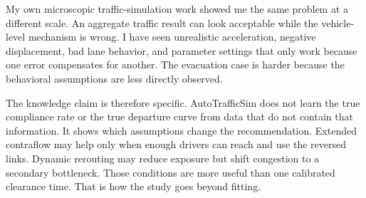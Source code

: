\begin{bibunit}[plainnat]
My own microscopic traffic-simulation work showed me the same problem
at a different scale. An aggregate traffic result can look acceptable
while the vehicle-level mechanism is wrong. I have seen unrealistic
acceleration, negative displacement, bad lane behavior, and parameter
settings that only work because one error compensates for another. The
evacuation case is harder because the behavioral assumptions are less
directly observed.

The knowledge claim is therefore specific. AutoTrafficSim does not
learn the true compliance rate or the true departure curve from data
that do not contain that information. It shows which assumptions change
the recommendation. Extended contraflow may help only when enough
drivers can reach and use the reversed links. Dynamic rerouting may
reduce exposure but shift congestion to a secondary bottleneck. Those
conditions are more useful than one calibrated clearance time. That is
how the study goes beyond fitting.


\bigskip
\putbib[refQ2]
\end{bibunit}






\iffalse






